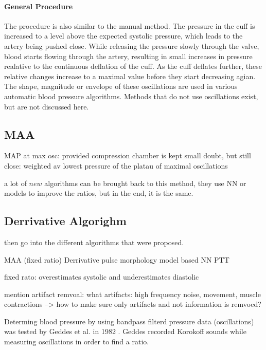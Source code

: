 \paragraph{General Procedure} The procedure is also similar to the manual method. The pressure in the cuff is increased to a level above the expected systolic pressure, which leads to the artery being pushed close. While releasing the pressure slowly through the valve, blood starts flowing through the artery, resulting in small increases in pressure realative to the continuous deflation of the cuff. As the cuff deflates further, these relative changes increase to a maximal value before they start decreasing agian.\cite{Forouzanfar2015,Drzewiecki1994,Ursino1996} The shape, magnitude or envelope of these oscillations are used in various automatic blood pressure algorithms. Methods that do not use oscillations exist, but are not discussed here.


\subsection{MAA}


MAP at max osc:\cite{Geddes1982,Drzewiecki1994,Babbs2012}\cite{Ramsey1979} provided compression chamber is kept small \cite{Mauck1980}
doubt, but still close: weighted av\cite{Chandrasekhar2019}
lowest pressure of the platau of maximal oscillations \cite{Ursino1996}


a lot of $new$ algorithms can be brought back to this method, they use NN or models to improve the ratios, but in the end, it is the same.
\subsection{Derrivative Algorighm}
then go into the different algorithms that were proposed.


MAA (fixed ratio)
Derrivative
pulse morphology
model based
NN
PTT

\cite{Chandrasekhar2019}
fixed rato: overestimates systolic and underestimates diastolic

mention artifact remvoal:
what artifacts: high frequency noise, movement, muscle contractions
 --> how to make sure only artifacts and not information is remvoed?


Determing blood pressure by using bandpass filterd pressure data (oscillations) was tested by Geddes et al. in 1982 \cite{Geddes1982}. Geddes recorded Korokoff sounds while measuring oscillations in order to find a ratio.

